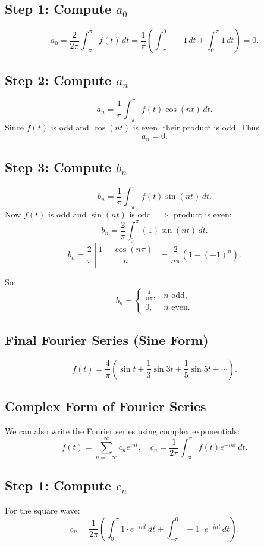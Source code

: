 \documentclass[a4paper,12pt]{article}
\begin{document}
\subsection{Step 1: Compute $a_0$}
\[
a_0 = \frac{2}{2\pi}\int_{-\pi}^{\pi} f(t)\,dt = \frac{1}{\pi}\left(\int_{-\pi}^{0} -1\,dt + \int_0^{\pi} 1\,dt\right) = 0.
\]

\subsection{Step 2: Compute $a_n$}
\[
a_n = \frac{1}{\pi}\int_{-\pi}^{\pi} f(t)\cos(nt)\,dt.
\]
Since $f(t)$ is odd and $\cos(nt)$ is even, their product is odd. Thus
\[
a_n = 0.
\]

\subsection{Step 3: Compute $b_n$}
\[
b_n = \frac{1}{\pi}\int_{-\pi}^{\pi} f(t)\sin(nt)\,dt.
\]
Now $f(t)$ is odd and $\sin(nt)$ is odd $\implies$ product is even:
\[
b_n = \frac{2}{\pi}\int_{0}^{\pi} (1)\sin(nt)\,dt.
\]
\[
b_n = \frac{2}{\pi} \left[ \frac{1 - \cos(n\pi)}{n} \right] = \frac{2}{n\pi}(1 - (-1)^n).
\]

So:
\[
b_n =
\begin{cases}
\frac{4}{n\pi}, & n \text{ odd}, \\
0, & n \text{ even}.
\end{cases}
\]

\subsection{Final Fourier Series (Sine Form)}
\[
f(t) = \frac{4}{\pi}\left( \sin t + \frac{1}{3}\sin 3t + \frac{1}{5}\sin 5t + \cdots \right).
\]

\subsection{Complex Form of Fourier Series}
We can also write the Fourier series using complex exponentials:
\[
f(t) = \sum_{n=-\infty}^{\infty} c_n e^{int}, \quad
c_n = \frac{1}{2\pi} \int_{-\pi}^{\pi} f(t) e^{-int}\,dt.
\]

\subsection{Step 1: Compute $c_n$}
For the square wave:
\[
c_n = \frac{1}{2\pi}\left(\int_0^\pi 1 \cdot e^{-int}\,dt + \int_{-\pi}^0 -1 \cdot e^{-int}\,dt\right).
\]
\end{document}
